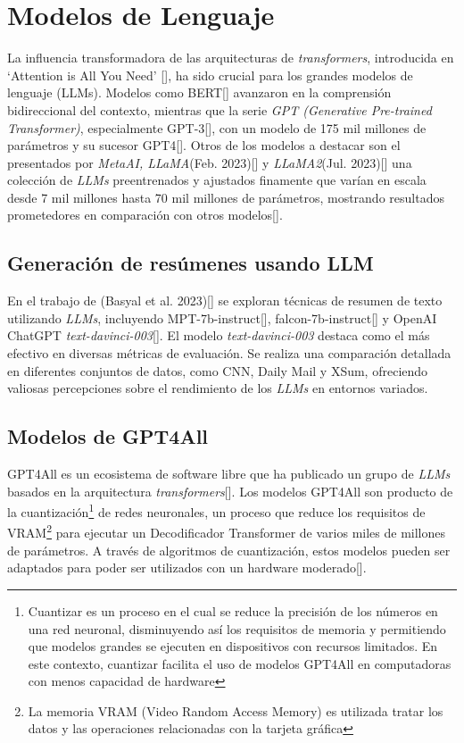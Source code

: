 \section{Modelos de Lenguaje}
   
    La influencia transformadora de las arquitecturas de \emph{transformers}, introducida en `Attention is All You Need' [\cite{attention}], ha sido crucial para los grandes modelos de lenguaje (LLMs). Modelos como BERT[\cite{BERT}] avanzaron en la comprensión bidireccional del contexto, mientras que la serie \emph{GPT (Generative Pre-trained Transformer)}, especialmente GPT-3[\cite{brown2020language}], con un modelo de 175 mil millones de parámetros y su sucesor GPT4[\cite{openai2023gpt4}]. Otros de los modelos a destacar son el presentados por \emph{MetaAI, LLaMA}(Feb. 2023)[\cite{llamapaper}] y \emph{LLaMA2}(Jul. 2023)[\cite{llamapaper2}] una colección de \emph{LLMs} preentrenados y ajustados finamente que varían en escala desde 7 mil millones hasta 70 mil millones de parámetros, mostrando resultados prometedores en comparación con otros modelos[\cite{metallama}]. 
    
    \subsection{Generación de resúmenes usando LLM}

    En el trabajo de (Basyal et al. 2023)[\cite{basyal2023text}] se exploran técnicas de resumen de texto utilizando \emph{LLMs}, incluyendo MPT-7b-instruct[\cite{mpt}], falcon-7b-instruct[\cite{falcon}] y OpenAI ChatGPT \emph{text-davinci-003}[\cite{brown2020language}]. El modelo \emph{text-davinci-003} destaca como el más efectivo en diversas métricas de evaluación. Se realiza una comparación detallada en diferentes conjuntos de datos, como CNN, Daily Mail y XSum, ofreciendo valiosas percepciones sobre el rendimiento de los \emph{LLMs} en entornos variados. 

    \subsection{Modelos de GPT4All}

        GPT4All es un ecosistema de software libre que ha publicado un grupo de \emph{LLMs} basados en la arquitectura \emph{transformers}[\cite{attention}]. Los modelos GPT4All son producto de la cuantización\footnote{Cuantizar es un proceso en el cual se reduce la precisión de los números en una red neuronal, disminuyendo así los requisitos de memoria y permitiendo que modelos grandes se ejecuten en dispositivos con recursos limitados. En este contexto, cuantizar facilita el uso de modelos GPT4All en computadoras con menos capacidad de hardware} de redes neuronales, un proceso que reduce los requisitos de VRAM\footnote{La memoria VRAM (Video Random Access Memory) es utilizada tratar los datos y las operaciones relacionadas con la tarjeta gráfica} para ejecutar un Decodificador Transformer de varios miles de millones de parámetros. A través de algoritmos de cuantización, estos modelos pueden ser adaptados para poder ser utilizados con un hardware moderado[\cite{webgpt4all}].
        
